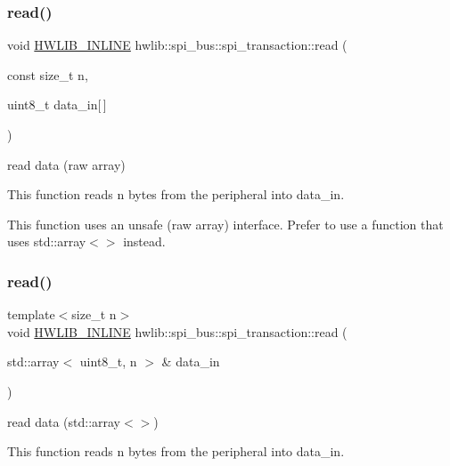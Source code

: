 \subsubsection{\texorpdfstring{read()}{read()}\hspace{0.1cm}{\footnotesize\ttfamily [1/2]}}
{\footnotesize\ttfamily void \hyperlink{hwlib-defines_8hpp_a520a8905adc71f1757aea4ce05183585}{H\+W\+L\+I\+B\+\_\+\+I\+N\+L\+I\+NE} hwlib\+::spi\+\_\+bus\+::spi\+\_\+transaction\+::read (\begin{DoxyParamCaption}\item[{const size\+\_\+t}]{n,  }\item[{uint8\+\_\+t}]{data\+\_\+in\mbox{[}$\,$\mbox{]} }\end{DoxyParamCaption})\hspace{0.3cm}{\ttfamily [inline]}}

read data (raw array)

This function reads n bytes from the peripheral into data\+\_\+in.

This function uses an unsafe (raw array) interface. Prefer to use a function that uses std\+::array$<$$>$ instead. \mbox{\label{classhwlib_1_1spi__bus_1_1spi__transaction_a4c1968dd719d580abbd8752262c5b8c3}} 
\subsubsection{\texorpdfstring{read()}{read()}\hspace{0.1cm}{\footnotesize\ttfamily [2/2]}}
{\footnotesize\ttfamily template$<$size\+\_\+t n$>$ \\
void \hyperlink{hwlib-defines_8hpp_a520a8905adc71f1757aea4ce05183585}{H\+W\+L\+I\+B\+\_\+\+I\+N\+L\+I\+NE} hwlib\+::spi\+\_\+bus\+::spi\+\_\+transaction\+::read (\begin{DoxyParamCaption}\item[{std\+::array$<$ uint8\+\_\+t, n $>$ \&}]{data\+\_\+in }\end{DoxyParamCaption})\hspace{0.3cm}{\ttfamily [inline]}}

read data (std\+::array$<$$>$)

This function reads n bytes from the peripheral into data\+\_\+in. \mbox{\label{classhwlib_1_1spi__bus_1_1spi__transaction_add2f3681b4455fe22109192d5fe3d9d5}} 
